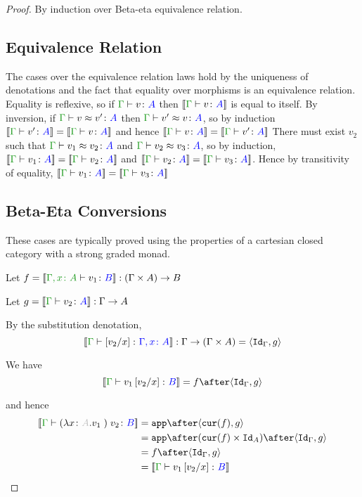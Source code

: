 \documentclass{report}
\begin{document}
\begin{framed}
    
    \begin{proof}
        By induction over Beta-eta equivalence relation.
        \subsection{Equivalence Relation}
        The cases over the equivalence relation laws hold by the uniqueness of denotations and the fact that equality over morphisms is an equivalence relation.
        Equality is reflexive, so if $\gtyperelation{v}{A}$ then $\deno{\gtyperelation{v}{A}}$ is equal to itself.
        By inversion, if $\gberelation{v}{v'}{A}$ then $\gberelation{v'}{v}{A}$, so by induction $\gdenoequality{v'}{v}{A}$ and hence $\gdenoequality{v}{v'}{A}$
        There must exist $v_2$ such that $\gberelation{v_1}{v_2}{A}$ and $\gberelation{v_2}{v_3}{A}$, so by induction,
        $\gdenoequality{v_1}{v_2}{A}$ and $\gdenoequality{v_2}{v_3}{A}$. Hence by transitivity of equality, $\gdenoequality{v_1}{v_3}{A}$
        
        \subsection{Beta-Eta Conversions}
        These cases are typically proved using the properties of a cartesian closed category with a strong graded monad.
        
            Let $f = \deno{\typerelation{\gax}{v_1}{B}}: (\G \times A) \rightarrow B$
        
            Let $g = \deno{\gtyperelation{v_2}{A}}: \G \rightarrow A$
        
            By the substitution denotation, $$\deno{\typerelation{\G}{\ssub{x}{v_2}}{\gax}}: \G \rightarrow (\G \times A) = \pr{\idg}{g}$$
        
            We have $$\deno{\gtyperelation{v_1\ssub{x}{v_2}}{B}} = f \after \pr{\idg}{g}$$
        
            and hence
            \begin{equation}
                \begin{split}
                    \deno{\gtyperelation{\apply{(\lam{x}{A}{v_1})}{v_2}}{B}} & = \app\after\pr{\cur{f}}{g} \\
                    & = \app\after(\cur{f}\times\Id{A})\after\pr{\idg}{g}\\
                    & = f \after \pr{\idg}{g} \\
                    & = \deno{\gtyperelation{v_1\ssub{x}{v_2}}{B}}  
                \end{split}
            \end{equation}
           

\end{proof}
\end{framed}
\end{document}
